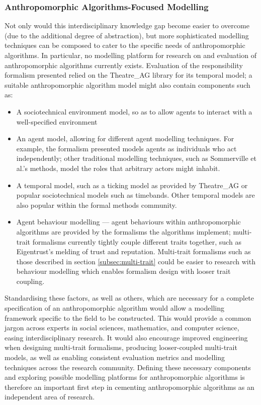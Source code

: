 \subsubsection{Anthropomorphic Algorithms-Focused Modelling}
Not only would this interdisciplinary knowledge gap become easier to overcome (due to the additional degree of abstraction), but more sophisticated modelling techniques can be composed to cater to the specific needs of anthropomorphic algorithms. In particular, no modelling platform for research on and evaluation of anthropomorphic algorithms currently exists. Evaluation of the responsibility formalism presented relied on the Theatre\_AG library for its temporal model; a suitable anthropomorphic algorithm model might also contain components such as:

\begin{itemize}
    \item A sociotechnical environment model, so as to allow agents to interact with a well-specified environment
    \item An agent model, allowing for different agent modelling techniques. For example, the formalism presented models agents as individuals who act independently; other traditional modelling techniques, such as Sommerville et al.'s methods, model the roles that arbitrary actors might inhabit.
    \item A temporal model, such as a ticking model as provided by Theatre\_AG or popular sociotechnical models such as timebands\cite{Burns2006}. Other temporal models are also popular within the formal methods community.
    \item Agent behaviour modelling --- agent behaviours within anthropomorphic algorithms are provided by the formalisms the algorithms implement; multi-trait formalisms currently tightly couple different traits together, such as Eigentrust's melding of trust and reputation. Multi-trait formalisms such as those described in section \ref{subsec:multi-trait} could be easier to research with behaviour modelling which enables formalism design with looser trait coupling.
\end{itemize}

Standardising these factors, as well as others, which are necessary for a complete specification of an anthropomorphic algorithm would allow a modelling framework specific to the field to be constructed. This would provide a common jargon across experts in social sciences, mathematics, and computer science, easing interdisciplinary research. It would also encourage improved engineering when designing multi-trait formalisms, producing looser-coupled multi-trait models, as well as enabling consistent evaluation metrics and modelling techniques across the research community. Defining these necessary components and exploring possible modelling platforms for anthropomorphic algorithms is therefore an important first step in cementing anthropomorphic algorithms as an independent area of research.\par

